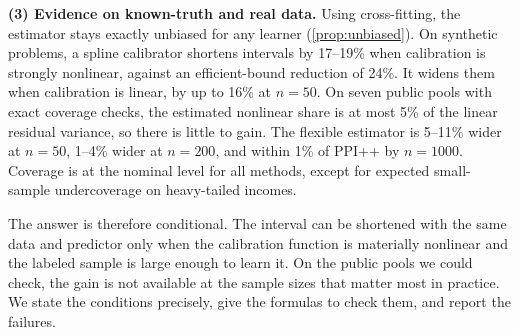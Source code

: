 \textbf{(3) Evidence on known-truth and real data.} Using cross-fitting, the estimator stays exactly unbiased for any learner (\cref{prop:unbiased}). On synthetic problems, a spline calibrator shortens intervals by 17--19\% when calibration is strongly nonlinear, against an efficient-bound reduction of 24\%. It widens them when calibration is linear, by up to 16\% at $n=50$. On seven public pools with exact coverage checks, the estimated nonlinear share is at most 5\% of the linear residual variance, so there is little to gain. The flexible estimator is 5--11\% wider at $n=50$, 1--4\% wider at $n=200$, and within 1\% of PPI++ by $n=1000$. Coverage is at the nominal level for all methods, except for expected small-sample undercoverage on heavy-tailed incomes.

The answer is therefore conditional. The interval can be shortened with the same data and predictor only when the calibration function is materially nonlinear and the labeled sample is large enough to learn it. On the public pools we could check, the gain is not available at the sample sizes that matter most in practice. We state the conditions precisely, give the formulas to check them, and report the failures.

